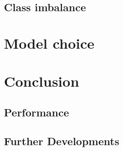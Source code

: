 \documentclass[conference,compsoc,11pt]{IEEEtran}
\begin{document}
\subsection{Class imbalance}\label{sec:cl_imb}

\section{Model choice}\label{sec:model-choice}


\section{Conclusion}

\subsection{Performance}


\subsection{Further Developments}
\end{document}
